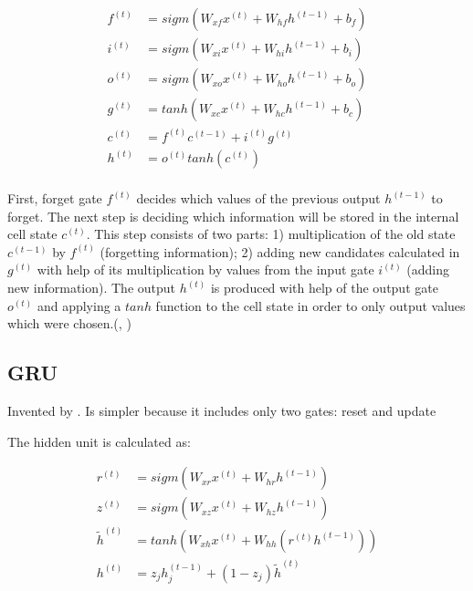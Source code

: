 \documentclass[]{krantz}
\begin{document}
\begin{align}
f^{(t)} & = sigm(W_{xf}x^{(t)}+W_{hf}h^{(t-1)}+b_{f}) \label{eq:lstm-forget} \\
i^{(t)} & = sigm(W_{xi}x^{(t)}+W_{hi}h^{(t-1)}+b_{i}) \label{eq:lstm-input} \\
o^{(t)} & = sigm(W_{xo}x^{(t)}+W_{ho}h^{(t-1)}+b_{o}) \label{eq:lstm-output} \\
g^{(t)} & = tanh(W_{xc}x^{(t)}+W_{hc}h^{(t-1)}+b_{c}) \label{eq:lstm-candidates} \\
c^{(t)} & = f^{(t)}c^{(t-1)}+i^{(t)}g^{(t)} \label{eq:lstm-newcell} \\
h^{(t)} & = o^{(t)}tanh(c^{(t)}) \label{eq:lstm-newoutput} \\
\end{align}
\citep{graves2013generating}

First, forget gate \(f^{(t)}\) decides which values of the previous output \(h^{(t-1)}\) to forget. The next step is deciding which information will be stored in the internal cell state \(c^{(t)}\). This step consists of two parts: 1) multiplication of the old state \(c^{(t-1)}\) by \(f^{(t)}\) (forgetting information); 2) adding new candidates calculated in \(g^{(t)}\) with help of its multiplication by values from the input gate \(i^{(t)}\) (adding new information). The output \(h^{(t)}\) is produced with help of the output gate \(o^{(t)}\) and applying a \(tanh\) function to the cell state in order to only output values which were chosen.(\citet{goodfellow2016deep}, \citet{graves2013generating})

\hypertarget{gru}{%
\subsection{GRU}\label{gru}}

Invented by \citet{cho2014learning}.
Is simpler because it includes only two gates: reset and update

The hidden unit is calculated as:

\begin{align}
r^{(t)} & = sigm(W_{xr}x^{(t)}+W_{hr}h^{(t-1)}) \label{eq:gru-reset} \\
z^{(t)} & = sigm(W_{xz}x^{(t)}+W_{hz}h^{(t-1)}) \label{eq:gru-update} \\
\tilde{h}^{(t)} & = tanh(W_{xh}x^{(t)}+W_{hh}(r^{(t)}h^{(t-1)})) \label{eq:gru-hidden} \\
h^{(t)} & = z_jh_j^{(t-1)}+(1-z_j)\tilde{h}^{(t)} \label{eq:gru-hidden-output} \\
\end{align}
\end{document}
